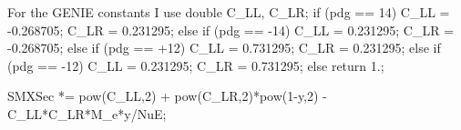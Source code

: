 \iffalse
For the GENIE constants I use
    double C_LL, C_LR;                                                                                                                                             
    if (pdg == 14) {                                                                                                                                               
      C_LL = -0.268705;                                                                                                                                            
      C_LR =  0.231295;                                                                                                                                            
    } else if (pdg == -14) {                                                                                                                                       
      C_LL =  0.231295;                                                                                                                                            
      C_LR = -0.268705;                                                                                                                                            
    } else if (pdg == +12) {                                                                                                                                       
      C_LL = 0.731295;                                                                                                                                             
      C_LR = 0.231295;                                                                                                                                             
    } else if (pdg == -12) {                                                                                                                                       
      C_LL = 0.231295;                                                                                                                                             
      C_LR = 0.731295;                                                                                                                                             
    } else return 1.;                                                                                                                                              
                                                                                                                                                                   
    SMXSec *= pow(C_LL,2) + pow(C_LR,2)*pow(1-y,2) -                                                                                                               
              C_LL*C_LR*M_e*y/NuE;

